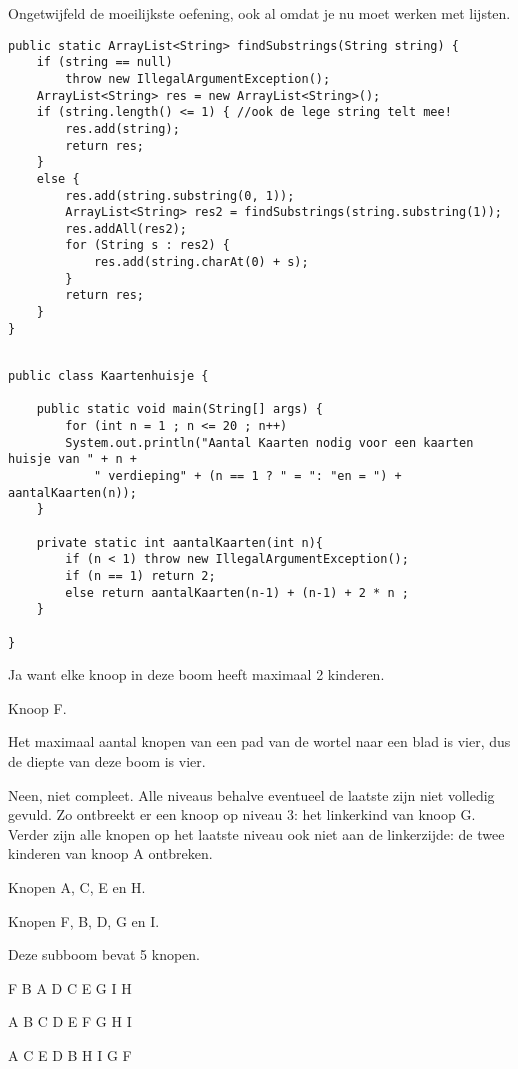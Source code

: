 \begin{Oplossing}{1.10}
Ongetwijfeld de moeilijkste oefening, ook al omdat je nu moet werken met lijsten.
\begin{lstlisting}[caption={Alle substrings van een gegeven string}, label=recfindsubstrings]
public static ArrayList<String> findSubstrings(String string) {
	if (string == null)
		throw new IllegalArgumentException();
	ArrayList<String> res = new ArrayList<String>();
	if (string.length() <= 1) { //ook de lege string telt mee!
		res.add(string);
		return res;
	}
	else {
		res.add(string.substring(0, 1));
		ArrayList<String> res2 = findSubstrings(string.substring(1));
		res.addAll(res2);
		for (String s : res2) {
			res.add(string.charAt(0) + s);
		}
		return res;
	}
}
\end{lstlisting}
\end{Oplossing}
\begin{Oplossing}{1.11}
\begin{lstlisting}[caption={Aantal kaarten nodig om een kaartenhuisje te maken}, label=reckaartenHuisje]

public class Kaartenhuisje {

	public static void main(String[] args) {
		for (int n = 1 ; n <= 20 ; n++)
		System.out.println("Aantal Kaarten nodig voor een kaarten huisje van " + n +
			" verdieping" + (n == 1 ? " = ": "en = ") + aantalKaarten(n));
	}
	
	private static int aantalKaarten(int n){
		if (n < 1) throw new IllegalArgumentException();
		if (n == 1) return 2;
		else return aantalKaarten(n-1) + (n-1) + 2 * n ;
	}

}
\end{lstlisting}

\end{Oplossing}
\begin{Oplossing}{2.1}

\begin{oefenumerate}
	\item Ja want elke knoop in deze boom heeft maximaal 2 kinderen.
	\item Knoop F.
	\item Het maximaal aantal knopen van een pad van de wortel naar
een blad is vier, dus de diepte van deze boom is vier.
	\item Neen, niet compleet.
Alle niveaus behalve eventueel de laatste zijn niet
volledig gevuld. Zo ontbreekt er een knoop op niveau 3:
het linkerkind van knoop G.
Verder zijn alle knopen op het laatste niveau ook niet
aan de linkerzijde: de twee kinderen van knoop A ontbreken.
	\item Knopen A, C, E en H.
	\item Knopen F, B, D, G en I.
	\item Deze subboom bevat 5 knopen.
	\item F B A D C E G I H
	\item A B C D E F G H I
	\item A C E D B H I G F

	
\end{oefenumerate}
\end{Oplossing}
